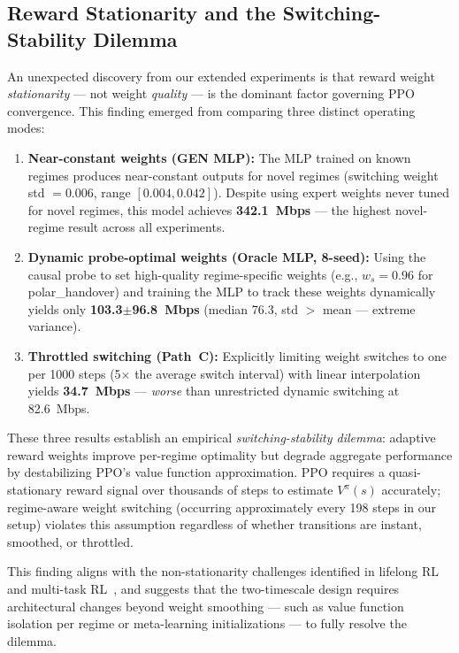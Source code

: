 \documentclass[conference]{IEEEtran}
\begin{document}
\subsection{Reward Stationarity and the Switching-Stability Dilemma}
\label{sec:dilemma}

An unexpected discovery from our extended experiments is that reward weight \emph{stationarity} --- not weight \emph{quality} --- is the dominant factor governing PPO convergence. This finding emerged from comparing three distinct operating modes:

\begin{enumerate}
\item \textbf{Near-constant weights (GEN MLP):} The MLP trained on known regimes produces near-constant outputs for novel regimes (switching weight std $= 0.006$, range $[0.004, 0.042]$). Despite using expert weights never tuned for novel regimes, this model achieves \textbf{342.1~Mbps} --- the highest novel-regime result across all experiments.

\item \textbf{Dynamic probe-optimal weights (Oracle MLP, 8-seed):} Using the causal probe to set high-quality regime-specific weights (e.g., $w_s = 0.96$ for polar\_handover) and training the MLP to track these weights dynamically yields only \textbf{103.3$\pm$96.8~Mbps} (median 76.3, std $>$ mean --- extreme variance).

\item \textbf{Throttled switching (Path~C):} Explicitly limiting weight switches to one per 1000 steps (5$\times$ the average switch interval) with linear interpolation yields \textbf{34.7~Mbps} --- \emph{worse} than unrestricted dynamic switching at 82.6~Mbps.
\end{enumerate}

These three results establish an empirical \emph{switching-stability dilemma}: adaptive reward weights improve per-regime optimality but degrade aggregate performance by destabilizing PPO's value function approximation. PPO requires a quasi-stationary reward signal over thousands of steps to estimate $V^\pi(s)$ accurately; regime-aware weight switching (occurring approximately every 198 steps in our setup) violates this assumption regardless of whether transitions are instant, smoothed, or throttled.

This finding aligns with the non-stationarity challenges identified in lifelong RL~\cite{abel2023continual} and multi-task RL~\cite{yu2020gradient_surgery}, and suggests that the two-timescale design requires architectural changes beyond weight smoothing --- such as value function isolation per regime or meta-learning initializations --- to fully resolve the dilemma.
\end{document}
